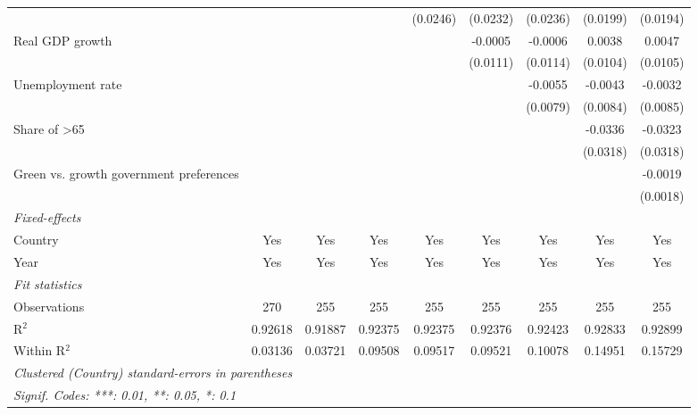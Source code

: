 \begin{table}[htbp]
\begin{tabular}{lcccccccc}
                                              &                 &                 &          & (0.0246) & (0.0232) & (0.0236) & (0.0199) & (0.0194)\\   
      Real GDP growth                         &                 &                 &          &          & -0.0005  & -0.0006  & 0.0038   & 0.0047\\   
                                              &                 &                 &          &          & (0.0111) & (0.0114) & (0.0104) & (0.0105)\\   
      Unemployment rate                       &                 &                 &          &          &          & -0.0055  & -0.0043  & -0.0032\\   
                                              &                 &                 &          &          &          & (0.0079) & (0.0084) & (0.0085)\\   
      Share of >65                            &                 &                 &          &          &          &          & -0.0336  & -0.0323\\   
                                              &                 &                 &          &          &          &          & (0.0318) & (0.0318)\\   
      Green vs. growth government preferences &                 &                 &          &          &          &          &          & -0.0019\\   
                                              &                 &                 &          &          &          &          &          & (0.0018)\\   
      \midrule
      \emph{Fixed-effects}\\
      Country                                 & Yes             & Yes             & Yes      & Yes      & Yes      & Yes      & Yes      & Yes\\  
      Year                                    & Yes             & Yes             & Yes      & Yes      & Yes      & Yes      & Yes      & Yes\\  
      \midrule
      \emph{Fit statistics}\\
      Observations                            & 270             & 255             & 255      & 255      & 255      & 255      & 255      & 255\\  
      R$^2$                                   & 0.92618         & 0.91887         & 0.92375  & 0.92375  & 0.92376  & 0.92423  & 0.92833  & 0.92899\\  
      Within R$^2$                            & 0.03136         & 0.03721         & 0.09508  & 0.09517  & 0.09521  & 0.10078  & 0.14951  & 0.15729\\  
      \midrule \midrule
      \multicolumn{9}{l}{\emph{Clustered (Country) standard-errors in parentheses}}\\
      \multicolumn{9}{l}{\emph{Signif. Codes: ***: 0.01, **: 0.05, *: 0.1}}\\
   \end{tabular}
\end{table}


